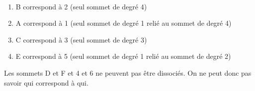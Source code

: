 \begin{Exercice}[5 minutes]
\begin{conseil}
    \end{conseil}
    \begin{solution}\\
        \begin{enumerate}
            \item B correspond à 2 (seul sommet de degré 4)
            \item A correspond à 1 (seul sommet de degré 1 relié au sommet de degré 4)
            \item C correspond à 3 (seul sommet de degré 3)
            \item E correspond à 5 (seul sommet de degré 1 relié au sommet de degré 2)
        \end{enumerate}
        Les sommets D et F et 4 et 6 ne peuvent pas être dissociés. On ne peut donc pas savoir qui correspond à qui.\\
    \end{solution}
\end{Exercice}

\newpage


